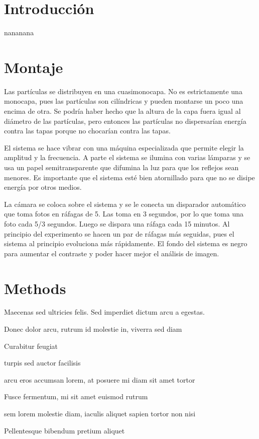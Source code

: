 \documentclass[twoside]{article}
\begin{document}
\begin{multicols}{2} %

\section*{Introducci\'on}

nananana


\section*{Montaje}

Las part\'iculas se distribuyen en una cuasimonocapa. No es estrictamente una monocapa, pues las part\'iculas son cil\'indricas y pueden montarse un poco una encima de otra. Se podr\'ia haber hecho que la altura de la capa fuera igual al di\'ametro de las part\'iculas, pero entonces las part\'iculas no dispersar\'ian energ\'ia contra las tapas porque no chocar\'ian contra las tapas.

El sistema se hace vibrar con una m\'aquina especializada que permite elegir la amplitud y la frecuencia. A parte el sistema se ilumina con varias l\'amparas y se usa un papel semitransparente que difumina la luz para que los reflejos sean menores. Es importante que el sistema est\'e bien atornillado para que no se disipe energ\'ia por otros medios.

La c\'amara se coloca sobre el sistema y se le conecta un disparador autom\'atico que toma fotos en r\'afagas de 5. Las toma en 3 segundos, por lo que toma una foto cada 5/3 segundos. Luego se dispara una r\'afaga cada 15 minutos. Al principio del experimento se hacen un par de r\'afagas m\'as seguidas, pues el sistema al principio evoluciona m\'as r\'apidamente. El fondo del sistema es negro para aumentar el contraste y poder hacer mejor el an\'alisis de imagen.


\section{Methods}

Maecenas sed ultricies felis. Sed imperdiet dictum arcu a egestas. 
\begin{compactitem}
\item Donec dolor arcu, rutrum id molestie in, viverra sed diam
\item Curabitur feugiat
\item turpis sed auctor facilisis
\item arcu eros accumsan lorem, at posuere mi diam sit amet tortor
\item Fusce fermentum, mi sit amet euismod rutrum
\item sem lorem molestie diam, iaculis aliquet sapien tortor non nisi
\item Pellentesque bibendum pretium aliquet
\end{compactitem}
\lipsum[4] %


\end{multicols}
\end{document}
